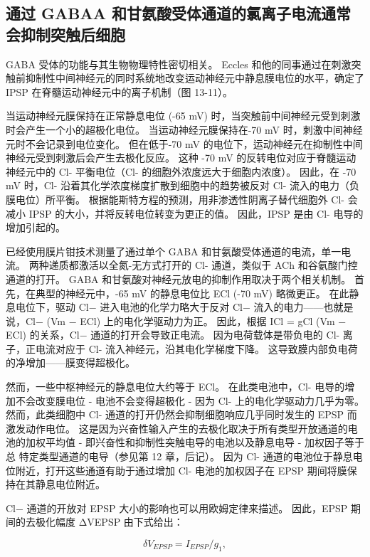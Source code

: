 \subsection{通过 GABAA 和甘氨酸受体通道的氯离子电流通常会抑制突触后细胞}
GABA 受体的功能与其生物物理特性密切相关。 Eccles 和他的同事通过在刺激突触前抑制性中间神经元的同时系统地改变运动神经元中静息膜电位的水平，确定了 IPSP 在脊髓运动神经元中的离子机制（图 13-11）。

当运动神经元膜保持在正常静息电位 (-65 mV) 时，当突触前中间神经元受到刺激时会产生一个小的超极化电位。 当运动神经元膜保持在-70 mV 时，刺激中间神经元时不会记录到电位变化。 但在低于-70 mV 的电位下，运动神经元在抑制性中间神经元受到刺激后会产生去极化反应。 这种 -70 mV 的反转电位对应于脊髓运动神经元中的 Cl- 平衡电位（Cl- 的细胞外浓度远大于细胞内浓度）。 因此，在 -70 mV 时，Cl- 沿着其化学浓度梯度扩散到细胞中的趋势被反对 Cl- 流入的电力（负膜电位）所平衡。 根据能斯特方程的预测，用非渗透性阴离子替代细胞外 Cl- 会减小 IPSP 的大小，并将反转电位转变为更正的值。 因此，IPSP 是由 Cl- 电导的增加引起的。

已经使用膜片钳技术测量了通过单个 GABA 和甘氨酸受体通道的电流，单一电流。 两种递质都激活以全氮-无方式打开的 Cl- 通道，类似于 ACh 和谷氨酸门控通道的打开。 GABA 和甘氨酸对神经元放电的抑制作用取决于两个相关机制。 首先，在典型的神经元中，-65 mV 的静息电位比 ECl (-70 mV) 略微更正。 在此静息电位下，驱动 Cl− 进入电池的化学力略大于反对 Cl− 流入的电力——也就是说，Cl− (Vm − ECl) 上的电化学驱动力为正。 因此，根据 ICl = gCl (Vm − ECl) 的关系，Cl− 通道的打开会导致正电流。 因为电荷载体是带负电的 Cl- 离子，正电流对应于 Cl- 流入神经元，沿其电化学梯度下降。 这导致膜内部负电荷的净增加——膜变得超极化。

然而，一些中枢神经元的静息电位大约等于 ECl。 在此类电池中，Cl- 电导的增加不会改变膜电位 - 电池不会变得超极化 - 因为 Cl- 上的电化学驱动力几乎为零。 然而，此类细胞中 Cl- 通道的打开仍然会抑制细胞响应几乎同时发生的 EPSP 而激发动作电位。 这是因为兴奋性输入产生的去极化取决于所有类型开放通道的电池的加权平均值 - 即兴奋性和抑制性突触电导的电池以及静息电导 - 加权因子等于总 特定类型通道的电导（参见第 12 章，后记）。 因为 Cl- 通道的电池位于静息电位附近，打开这些通道有助于通过增加 Cl- 电池的加权因子在 EPSP 期间将膜保持在其静息电位附近。

Cl− 通道的开放对 EPSP 大小的影响也可以用欧姆定律来描述。 因此，EPSP 期间的去极化幅度 ΔVEPSP 由下式给出：

\begin{equation}\label{depolarization_amplitude}
	\delta V_{EPSP} = I_{EPSP} / g_1,
\end{equation}

